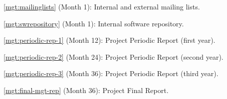\begin{Workpackage}{\thewpno}
\begin{WPDeliverables}
\begin{compactitem}
\item
\ref{mgt:mailinglists}
(Month 1): 
Internal and external mailing lists.
\item
\ref{mgt:swrepository}
(Month 1): 
Internal software repository.
\item
\ref{mgt:periodic-rep-1}
(Month 12): 
Project Periodic Report (first year).
\item
\ref{mgt:periodic-rep-2}
 (Month 24): 
Project Periodic Report (second year).
\item
\ref{mgt:periodic-rep-3}
(Month 36): 
Project Periodic Report (third year).
\item
\ref{mgt:final-mgt-rep}
(Month 36): 
Project Final Report.
\end{compactitem}
\end{WPDeliverables}
\end{Workpackage}
